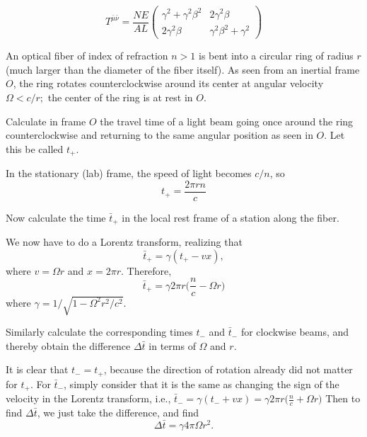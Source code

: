 \documentclass[11pt,largemargins]{homework}
\begin{document}
\begin{alphaparts}
\begin{equation}
T^{\bar{\mu} \bar{\nu}} = \frac{NE}{AL} \begin{pmatrix} \gamma^2 + \gamma^2 \beta^2 & 2 \gamma^2 \beta \\ 2 \gamma^2 \beta & \gamma^2 \beta^2 + \gamma^2 \end{pmatrix}
\end{equation}
\end{alphaparts}

\question An optical fiber of index of refraction $n > 1$ is bent into a circular ring of radius $r$ (much larger than the diameter of the fiber itself).  As seen from an inertial frame $O$, the ring rotates counterclockwise around its center at angular velocity $\Omega < c/r;$ the center of the ring is at rest in $O$.

\begin{alphaparts}
\questionpart
Calculate in frame $O$ the travel time of a light beam going once around the ring counterclockwise and returning to the same angular position as seen in $O$.  Let this be called $t_{+}$. 

In the stationary (lab) frame, the speed of light becomes $c/n$, so 
\begin{equation}
t_{+} = \frac{2 \pi r n}{c}
\end{equation}

\questionpart 
Now calculate the time $\bar{t}_{+}$ in the local rest frame of a station along the fiber.

We now have to do a Lorentz transform, realizing that
$$\bar{t}_{+} = \gamma (t_{+} - vx),$$
where $v = \Omega r$ and $x = 2 \pi r$. Therefore,
\begin{equation}
\bar{t}_{+} = \gamma 2 \pi r \big(\frac{n}{c} - \Omega r\big)
\end{equation}
where $\gamma = 1/\sqrt{1 - \Omega^2 r^2 / c^2}$.

\questionpart
Similarly calculate the corresponding times $t_{-}$ and $\bar{t}_{-}$ for clockwise beams, and thereby obtain the difference $\Delta \bar{t}$ in terms of $\Omega$ and $r$. 

It is clear that $t_{-}  = t_{+}$, because the direction of rotation already did not matter for $t_{+}$.  For $\bar{t}_{-}$, simply consider that it is the same as changing the sign of the velocity in the Lorentz transform, i.e.,
$
\bar{t}_{-} = \gamma (t_{-} + vx) = \gamma 2 \pi r \big(\frac{n}{c} + \Omega r \big)
$
Then to find $\Delta \bar{t}$, we just take the difference, and find
\begin{equation}
\Delta \bar{t} = \gamma 4 \pi \Omega r^2 .
\end{equation}
\end{alphaparts}	
\end{document}
